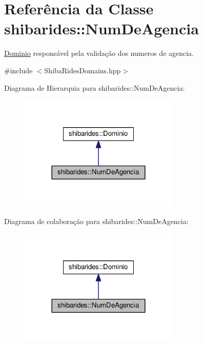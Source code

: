 \hypertarget{classshibarides_1_1NumDeAgencia}{}\section{Referência da Classe shibarides\+:\+:Num\+De\+Agencia}
\label{classshibarides_1_1NumDeAgencia}


\hyperlink{classshibarides_1_1Dominio}{Dominio} responsável pela validação dos numeros de agencia.  




{\ttfamily \#include $<$Shiba\+Rides\+Domains.\+hpp$>$}



Diagrama de Hierarquia para shibarides\+:\+:Num\+De\+Agencia\+:\nopagebreak
\begin{figure}[H]
\begin{center}
\leavevmode
\includegraphics[width=216pt]{classshibarides_1_1NumDeAgencia__inherit__graph}
\end{center}
\end{figure}


Diagrama de colaboração para shibarides\+:\+:Num\+De\+Agencia\+:\nopagebreak
\begin{figure}[H]
\begin{center}
\leavevmode
\includegraphics[width=216pt]{classshibarides_1_1NumDeAgencia__coll__graph}
\end{center}
\end{figure}

